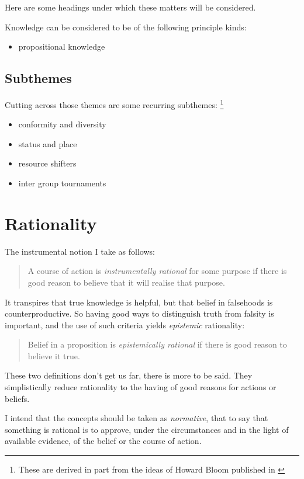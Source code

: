 \documentclass[10pt,titlepage]{article}
\begin{document}
Here are some headings under which these matters will be considered.

Knowledge can be considered to be of the following principle kinds:

\begin{itemize}
\item propositional knowledge
  \end{itemize}


\subsection{Subthemes}

Cutting across those themes are some recurring subthemes:
\footnote{These are derived in part from the ideas of Howard Bloom published in \cite{bloom-bs,bloomBRAIN}}

  \begin{itemize}
\item conformity and diversity
\item status and place
\item resource shifters
\item inter group tournaments
  \end{itemize}

  \section{Rationality}
  
The instrumental notion I take as follows:
\begin{quote}
  A course of action is \emph{instrumentally rational} for some purpose if there is good reason to believe that it will realise that purpose.
\end{quote}

It transpires that true knowledge is helpful, but that belief in falsehoods is counterproductive.
So having good ways to distinguish truth from falsity is important, and the use of such criteria yields \emph{epistemic} rationality:

\begin{quote}
Belief in a proposition is \emph{epistemically rational} if there is good reason to believe it true.
\end{quote}

These two definitions don't get us far, there is more to be said.
They simplistically reduce rationality to the having of good reasons for actions or beliefs.

I intend that the concepts should be taken as \emph{normative}, that to say that something is rational is to approve, under the circumstances and in the light of available evidence, of the belief or the course of action.
\end{document}
